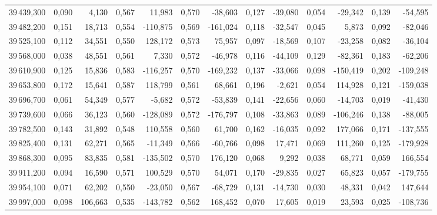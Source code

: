 \begin{longtable}{rrrrrrrrrrrrr}
39\,439,300 & 0,090 & 4,130 & 0,567 & 11,983 & 0,570 & -38,603 & 0,127 & -39,080 & 0,054 & -29,342 & 0,139 & -54,595\\
39\,482,200 & 0,151 & 18,713 & 0,554 & -110,875 & 0,569 & -161,024 & 0,118 & -32,547 & 0,045 & 5,873 & 0,092 & -82,046\\
39\,525,100 & 0,112 & 34,551 & 0,550 & 128,172 & 0,573 & 75,957 & 0,097 & -18,569 & 0,107 & -23,258 & 0,082 & -36,104\\
39\,568,000 & 0,038 & 48,551 & 0,561 & 7,330 & 0,572 & -46,978 & 0,116 & -44,109 & 0,129 & -82,361 & 0,183 & -62,206\\
39\,610,900 & 0,125 & 15,836 & 0,583 & -116,257 & 0,570 & -169,232 & 0,137 & -33,066 & 0,098 & -150,419 & 0,202 & -109,248\\
39\,653,800 & 0,172 & 15,641 & 0,587 & 118,799 & 0,561 & 68,661 & 0,196 & -2,621 & 0,054 & 114,928 & 0,121 & -159,038\\
39\,696,700 & 0,061 & 54,349 & 0,577 & -5,682 & 0,572 & -53,839 & 0,141 & -22,656 & 0,060 & -14,703 & 0,019 & -41,430\\
39\,739,600 & 0,066 & 36,123 & 0,560 & -128,089 & 0,572 & -176,797 & 0,108 & -33,863 & 0,089 & -106,246 & 0,138 & -88,005\\
39\,782,500 & 0,143 & 31,892 & 0,548 & 110,558 & 0,560 & 61,700 & 0,162 & -16,035 & 0,092 & 177,066 & 0,171 & -137,555\\
39\,825,400 & 0,131 & 62,271 & 0,565 & -11,349 & 0,566 & -60,766 & 0,098 & 17,471 & 0,069 & 111,260 & 0,125 & -179,928\\
39\,868,300 & 0,095 & 83,835 & 0,581 & -135,502 & 0,570 & 176,120 & 0,068 & 9,292 & 0,038 & 68,771 & 0,059 & 166,554\\
39\,911,200 & 0,094 & 16,590 & 0,571 & 100,529 & 0,570 & 54,071 & 0,170 & -29,835 & 0,027 & 65,823 & 0,057 & -179,755\\
39\,954,100 & 0,071 & 62,202 & 0,550 & -23,050 & 0,567 & -68,729 & 0,131 & -14,730 & 0,030 & 48,331 & 0,042 & 147,644\\
39\,997,000 & 0,098 & 106,663 & 0,535 & -143,782 & 0,562 & 168,452 & 0,070 & 17,605 & 0,019 & 23,593 & 0,025 & -108,736\\
\end{longtable}
